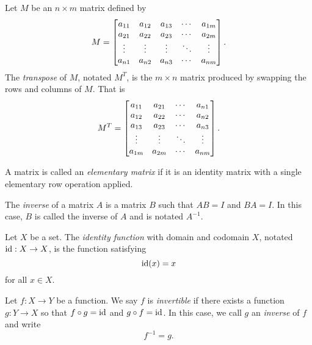 \begin{SaveDefinition}[
	key=Transpose,
	title={Transpose}]

	Let $M$ be an $n\times m$ matrix defined by
	\[
		M=\begin{bmatrix}
			a_{11}&a_{12}&a_{13}&\cdots & a_{1m}\\
		a_{21}&a_{22}&a_{23}&\cdots&a_{2m}\\
		\vdots &\vdots&\vdots &\ddots&\vdots\\
		a_{n1}&a_{n2}&a_{n3}&\cdots&a_{nm}\end{bmatrix}.
	\]
	The \emph{transpose} of $M$, notated $M^T$, is the $m\times n$ matrix produced by swapping the rows
	and columns of $M$. That is
	\[
		M^T=\begin{bmatrix}
		a_{11}&a_{21}&\cdots&a_{n1}\\
		a_{12}&a_{22}&\cdots&a_{n2}\\
		a_{13}&a_{23}&\cdots&a_{n3}\\
		\vdots&\vdots&\ddots&\vdots\\
		a_{1m}&a_{2m}&\cdots&a_{nm}\end{bmatrix}.
	\]
\end{SaveDefinition}

\begin{SaveDefinition}[
	key=ElementaryMatrix,
	title={Elementary Matrix}]

	A matrix is called an \emph{elementary matrix} if it is an identity matrix with a single elementary row operation applied.
\end{SaveDefinition}

\begin{SaveDefinition}[
	key=MatrixInverse,
	title={Matrix Inverse}]
		
	The \emph{inverse} of a matrix $A$ is a
		matrix $B$ such that $AB=I$ and $BA=I$.
		In this case, $B$ is called the inverse of $A$ and is notated $A^{-1}$.
\end{SaveDefinition}

\begin{SaveDefinition}[
	key=IdentityFunction,
	title={Identity Function}]
	
	Let $X$ be a set. The \emph{identity function} with domain and codomain $X$,
	notated $\operatorname{\operatorname{id}}:X\to X$, is the function satisfying
	\[
		\operatorname{\operatorname{id}}(x)=x
	\]
	for all $x\in X$.
\end{SaveDefinition}

\begin{SaveDefinition}[
	key=InverseFunction,
	title={Inverse Function}]
		
	Let $f:X\to Y$ be a function. We say $f$ is \emph{invertible} if
	there exists a function $g:Y\to X$ so that $f\circ g=\operatorname{\operatorname{id}}$ and $g\circ f=\operatorname{\operatorname{id}}$.
	In this case, we call $g$ an \emph{inverse} of $f$ and write
	\[
		f^{-1}=g.
	\]
\end{SaveDefinition}


